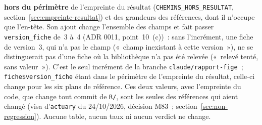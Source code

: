 \documentclass[a4paper,11pt]{article}
\newcommand{\code}[1]{\texttt{\small #1}}
\begin{document}
\textbf{hors du périmètre} de l'empreinte du résultat
(\code{CHEMINS\_HORS\_RESULTAT}, section~\ref{sec:empreinte-resultat}) et
des grandeurs des références, dont il n'occupe que l'en-tête. Son ajout
change l'ensemble des champs et fait passer \code{version\_fiche} de~3
à~4 (ADR 0011, point~10~(c))~: sans l'incrément, une fiche de version~3,
qui n'a pas le champ («~champ inexistant à cette version~»), ne se
distinguerait pas d'une fiche où la bibliothèque n'a pas été relevée
(«~relevé tenté, sans valeur~»). C'est le seul incrément de la branche
\code{claude/rapport-fige}~; \code{fiche\$version\_fiche} étant dans le
périmètre de l'empreinte du résultat, celle-ci change pour les six plans
de référence. Ces deux valeurs, avec l'empreinte du code, que change tout
commit de \code{R/}, sont les seules des références qui aient changé (visa
d'\code{actuary} du 24/10/2026, décision M83~;
section~\ref{sec:non-regression}). Aucune table, aucun taux ni aucun
verdict ne change.\par
\endgroup
\end{document}
